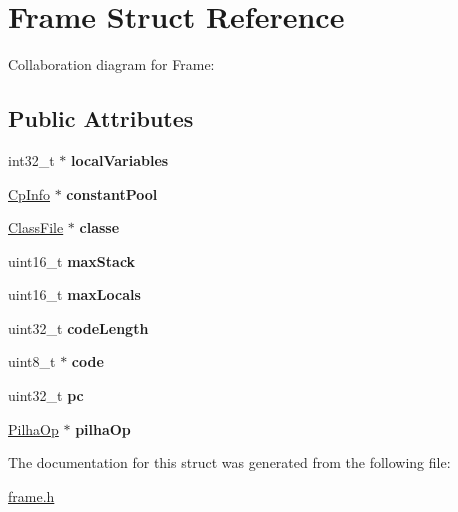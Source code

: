 \hypertarget{structFrame}{}\section{Frame Struct Reference}
\label{structFrame}


Collaboration diagram for Frame\+:
\subsection*{Public Attributes}
\begin{DoxyCompactItemize}
\item 
\mbox{\label{structFrame_a9047c9524d44fc81cb6311de8a2a8b77}} 
int32\+\_\+t $\ast$ {\bfseries local\+Variables}
\item 
\mbox{\label{structFrame_a8067fdcfa9b9b35c39434ed4689b3aea}} 
\hyperlink{structCpInfo}{Cp\+Info} $\ast$ {\bfseries constant\+Pool}
\item 
\mbox{\label{structFrame_a3ce27d5278d61a0abaeca31956febc1f}} 
\hyperlink{structClassFile}{Class\+File} $\ast$ {\bfseries classe}
\item 
\mbox{\label{structFrame_a378c00e14ef1f63cbbfa4e984502b652}} 
uint16\+\_\+t {\bfseries max\+Stack}
\item 
\mbox{\label{structFrame_a5d933cb41bf8f544aecba4ef1723ab1a}} 
uint16\+\_\+t {\bfseries max\+Locals}
\item 
\mbox{\label{structFrame_a1ed982d1a0902c22374fcde6a8938b69}} 
uint32\+\_\+t {\bfseries code\+Length}
\item 
\mbox{\label{structFrame_a9de8be272246d00c7a0c2ddc899fe8f2}} 
uint8\+\_\+t $\ast$ {\bfseries code}
\item 
\mbox{\label{structFrame_a91e50d2091184efb52b6d7c0c21fd4b2}} 
uint32\+\_\+t {\bfseries pc}
\item 
\mbox{\label{structFrame_addbe682d4328100186a4c03da7c2b9a2}} 
\hyperlink{structPilhaOp}{Pilha\+Op} $\ast$ {\bfseries pilha\+Op}
\end{DoxyCompactItemize}


The documentation for this struct was generated from the following file\+:\begin{DoxyCompactItemize}
\item 
\hyperlink{frame_8h}{frame.\+h}\end{DoxyCompactItemize}
